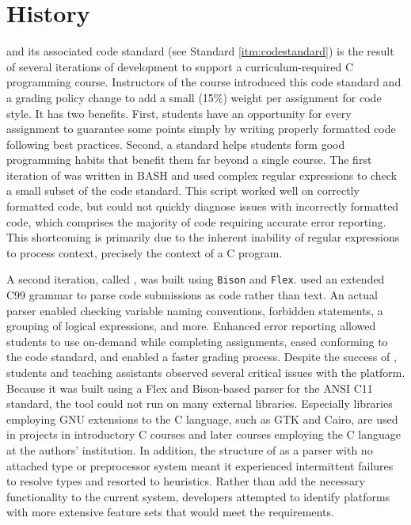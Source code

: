 \documentclass[sigconf]{acmart}
\begin{document}
\section{History}


\tool{} and its associated code standard (see Standard \ref{itm:codestandard}) is the result of several iterations
of development to support a curriculum-required C programming course. Instructors of the course introduced
this code standard and a grading policy change to add a small (15\%) weight per assignment for code
style. It has two benefits. First, students have an opportunity for every assignment to  guarantee some
points simply by writing properly formatted code following best practices. Second, a standard
helps students form good programming habits that benefit them far beyond a single course. The first
iteration of \oldtool{} was written in BASH and used complex regular expressions to check a small
subset of the code standard. This script worked well on correctly formatted code, but could not
quickly diagnose issues with incorrectly formatted code, which comprises the majority of code requiring
accurate error reporting. This shortcoming is primarily due to the inherent
inability of regular expressions to process context, precisely the context of a C program.

A second iteration, called \oldtool{}, was built using \texttt{Bison} and \texttt{Flex}. \oldtool{} used an extended
C99 grammar to parse code submissions as code rather than text. An actual parser enabled
checking variable naming conventions, forbidden statements,
a grouping of logical expressions, and more. Enhanced error reporting allowed students
to use \oldtool{} on-demand while completing assignments, eased conforming to the code standard, and enabled
a faster grading process. Despite the success of \oldtool{}, students and teaching
assistants observed several critical issues with the platform. Because it was built using a Flex and Bison-based parser for the ANSI C11 standard, the tool could not
run on many external libraries. Especially libraries employing GNU
extensions to the C language, such as GTK and Cairo, are used in projects in introductory C courses and later
courses employing the C language at the authors’ institution. In addition,
the structure of \oldtool{} as a parser with no attached type or preprocessor
system meant it experienced intermittent failures to resolve types and resorted to heuristics.
Rather than add the necessary functionality to the current system, developers attempted to identify platforms with more extensive feature sets that would meet the requirements.
\end{document}

